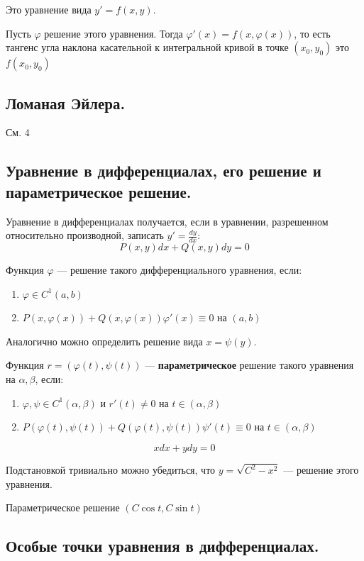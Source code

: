 Это уравнение вида \(y' = f(x, y)\).

Пусть \(\varphi\) решение этого уравнения. Тогда \(\varphi'(x) = f(x, \varphi(x))\), то есть тангенс угла наклона касательной к интегральной кривой в точке \((x_0, y_0)\) это \(f(x_0, y_0)\)

\subsection*{Ломаная Эйлера.}

См. 4

\subsection*{Уравнение в дифференциалах, его решение и параметрическое решение.}

Уравнение в дифференциалах получается, если в уравнении, разрешенном относительно производной, записать \(y' = \frac{dy}{dx} \):
\[P(x, y) dx + Q(x, y) dy = 0\]

Функция \(\varphi\) --- решение такого дифференциального уравнения, если:
\begin{enumerate}
    \item \(\varphi\in C^1(a, b)\)
    \item \(P(x, \varphi(x)) + Q(x, \varphi(x)) \varphi'(x) \equiv 0\) на \((a, b)\)
\end{enumerate}

Аналогично можно определить решение вида \(x = \psi(y)\).

Функция \(r = (\varphi(t), \psi(t))\) --- \textbf{параметрическое} решение такого уравнения на \(\alpha, \beta\), если:
\begin{enumerate}
    \item \(\varphi, \psi\in C^{1}(\alpha, \beta)\) и \(r'(t)\neq 0\) на \(t\in (\alpha, \beta)\)
    \item \(P(\varphi(t), \psi(t)) + Q(\varphi(t), \psi(t))\psi'(t) \equiv 0\) на \(t\in (\alpha, \beta)\)
\end{enumerate}

\begin{example}
    \[xdx + ydy = 0\]

    Подстановкой тривиально можно убедиться, что \(y = \sqrt{C^2 - x^2}\) --- решение этого уравнения.

    Параметрическое решение \((C\cos t, C\sin t)\)
\end{example}

\subsection*{Особые точки уравнения в дифференциалах.}

